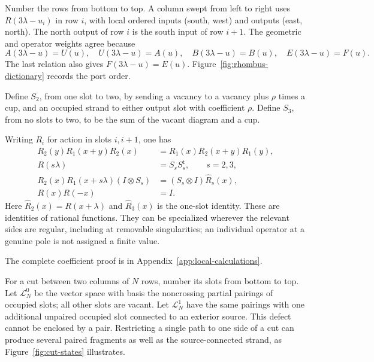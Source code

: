 

Number the rows from bottom to top. A column swept from left to right
uses $R(3\lambda-u_i)$ in row $i$, with local ordered inputs
(south, west) and outputs (east, north). The north output of row $i$
is the south input of row $i+1$. The geometric and operator weights agree
because
\[
 A(3\lambda-u)=U(u),\quad U(3\lambda-u)=A(u),\quad
 B(3\lambda-u)=B(u),\quad E(3\lambda-u)=F(u).
\]
The last relation also gives $F(3\lambda-u)=E(u)$.
Figure~\ref{fig:rhombus-dictionary} records the port order.




Define $S_2$, from one slot to two, by sending a vacancy to a vacancy
plus $\rho$ times a cup, and an occupied strand to either output slot
with coefficient $\rho$. Define $S_3$, from no slots to two, to be the
sum of the vacant diagram and a cup.

\begin{lemma}\label{lem:local-identities}
Writing $R_i$ for action in slots $i,i+1$, one has
\begin{align}
 R_2(y)R_1(x+y)R_2(x)&=R_1(x)R_2(x+y)R_1(y),
       \label{eq:01-braid}\\
 R(s\lambda)&=S_sS_s^{\mathsf t},\qquad s=2,3,
       \label{eq:01-factorization}\\
 R_2(x)R_1(x+s\lambda)(I\otimes S_s)
       &=(S_s\otimes I)\widehat R_s(x),
       \label{eq:01-splitting}\\
 R(x)R(-x)&=I.\label{eq:01-unitarity}
\end{align}
Here $\widehat R_2(x)=R(x+\lambda)$ and $\widehat R_3(x)$ is the
one-slot identity. These are identities of rational functions. They
can be specialized wherever the relevant sides are regular, including
at removable singularities; an individual operator at a genuine pole
is not assigned a finite value.
\end{lemma}

The complete coefficient proof is in Appendix~\ref{app:local-calculations}.


For a cut between two columns of $N$ rows, number its slots from
bottom to top. Let $\mathcal L_N^0$ be the vector space with basis the
noncrossing partial pairings of occupied slots; all other slots are
vacant. Let $\mathcal L_N^1$ have the same pairings with one additional
unpaired occupied slot connected to an exterior source. This defect
cannot be enclosed by a pair. Restricting a single path to one side
of a cut can produce several paired fragments as well as the
source-connected strand, as Figure~\ref{fig:cut-states} illustrates.

